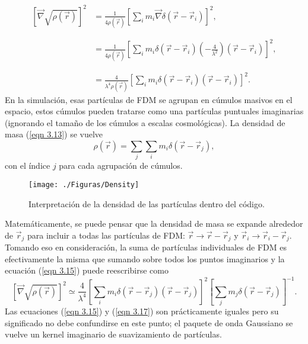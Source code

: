 \documentclass[a4paper,openright,12pt]{book}
\begin{document}
\begin{equation}
\begin{array}{ll}
\left[\vec{\nabla}\sqrt{\rho (\vec{r})}\right]^{2} &=
\frac{1}{4\rho(\vec{r})}\left[\sum_{i} m_{i}\vec{\nabla}\delta(\vec{r}-\vec{r}_{i})\right]^{2}, \\\\\\ 
&=
\frac{1}{4\rho(\vec{r})} 
\left[\sum_{i}
m_{i}\delta(\vec{r}-\vec{r}_{i})(-\frac{4}{\lambda^{2}})(\vec{r}-\vec{r}_{i})\right]^{2}, \\\\\\
&=
\frac{4}{\lambda^{4}\rho(\vec{r})}
\left[
\sum_{i} m_{i}\delta(\vec{r}-\vec{r}_{i})(\vec{r}-\vec{r}_{i})
\right]^{2}. \label{eqn 3.15}

\end{array}
\end{equation}
En la simulación, esas partículas de FDM se agrupan en cúmulos masivos en el espacio, estos cúmulos pueden tratarse como una partículas puntuales imaginarias (ignorando el tamaño de los cúmulos a escalas cosmológicas). La densidad de masa (\ref{eqn 3.13}) se vuelve
\begin{equation}
\rho(\vec{r})
=
\sum_{j}\sum_{i}m_{i}\delta(\vec{r}-\vec{r}_{j}),\label{eqn 3.16}
\end{equation} 
con el índice $j$ para cada agrupación de cúmulos. 

\begin{figure}
\centering
\texttt{[image: ./Figuras/Density]}
\caption{\footnotesize{Interpretación de la densidad de las partículas dentro del código.}}
\end{figure}

Matemáticamente, se puede pensar que la densidad de masa se expande alrededor de $\vec{r}_{j}$ para incluir a todas las partículas de FDM: $\vec{r} \rightarrow \vec{r}-\vec{r}_{j}$ y $\vec{r}_{i} \rightarrow \vec{r}_{i} - \vec{r}_{j}$. Tomando eso en consideración, la suma de partículas individuales de FDM es efectivamente la misma que sumando sobre todos los puntos imaginarios y la ecuación (\ref{eqn 3.15}) puede reescribirse como 
\begin{equation}
\left[\vec{\nabla}\sqrt{\rho (\vec{r})}\right]^{2} \simeq 
\frac{4}{\lambda^{4}}
\left[
\sum_{i}m_{i}\delta(\vec{r}-\vec{r}_{j})(\vec{r}-\vec{r}_{j})
\right]^{2}
\left[
\sum_{j}m_{j}\delta(\vec{r}-\vec{r}_{j})
\right]^{-1}. \label{eqn 3.17}
\end{equation}
Las ecuaciones (\ref{eqn 3.15}) y (\ref{eqn 3.17}) son prácticamente iguales pero su significado no debe confundirse en este punto; el paquete de onda Gaussiano se vuelve un kernel imaginario de suavizamiento de partículas.
\end{document}
